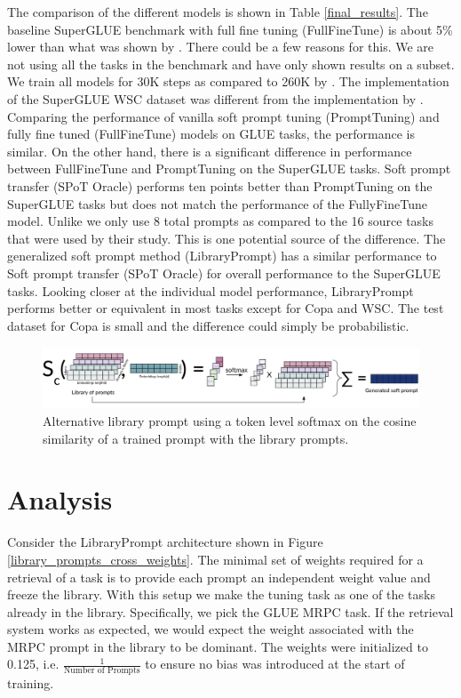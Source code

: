 \documentclass[final,6p,times,twocolumn,authoryear]{elsarticle}
\begin{document}
The comparison of the different models is shown in Table \ref{final_results}. The baseline SuperGLUE benchmark with full fine tuning (FullFineTune)  is about 5\% lower than what was shown by \cite{lester_2021}. There could be a few reasons for this. We are not using all the tasks in the benchmark and have only shown results on a subset. We train all models for 30K steps as compared to 260K by \cite{lester_2021}. The implementation of the SuperGLUE WSC dataset was different from the implementation by \cite{raffel_2022}.  Comparing the performance of vanilla soft prompt tuning (PromptTuning) and fully fine tuned (FullFineTune) models on GLUE tasks, the performance is similar. On the other hand, there is a significant difference in performance between FullFineTune and PromptTuning on the SuperGLUE tasks.  Soft prompt transfer (SPoT Oracle) performs ten points better than PromptTuning on the SuperGLUE tasks but does not match the performance of the FullyFineTune model. Unlike \cite{lester_2021} we only use 8 total prompts as compared to the 16 source tasks that were used by their study. This is one potential source of the difference. The generalized soft prompt method (LibraryPrompt) has a similar performance to Soft prompt transfer (SPoT Oracle) for overall performance to the SuperGLUE tasks. Looking closer at the individual model performance, LibraryPrompt performs better or equivalent in most tasks except for Copa and WSC. The test dataset for Copa is small and the difference could simply be probabilistic.


\begin{figure}[t]
\includegraphics[width=\textwidth]{softmax.png}
\caption{Alternative library prompt using a token level softmax on the cosine similarity of a trained prompt with the library prompts.}
\label{softmax}
\centering
\end{figure}

\section{Analysis}
Consider the LibraryPrompt architecture shown in Figure \ref{library_prompts_cross_weights}. The minimal set of weights required for a retrieval of a task is to provide each prompt an independent weight value and freeze the library. With this setup we make the tuning task as one of the tasks already in the library. Specifically, we pick the GLUE MRPC task. If the retrieval system works as expected, we would expect the weight associated with the MRPC prompt in the library to be dominant. The weights were initialized to 0.125, i.e. $\frac{1}{\text{Number of Prompts}}$ to ensure no bias was introduced at the start of training.
\end{document}
